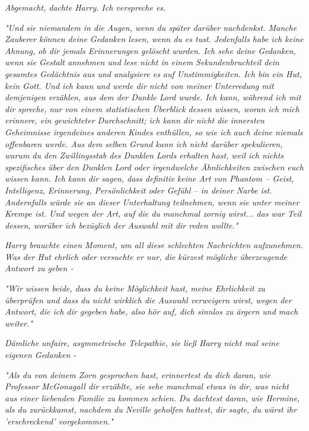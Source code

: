 {\emph{Abgemacht,} \emph{dachte Harry.} \emph{\emph{Ich verspreche es.}}

\emph{"Und sie niemandem in die Augen, wenn du später darüber nachdenkst. Manche Zauberer können deine Gedanken lesen, wenn du es tust. Jedenfalls habe ich keine Ahnung, ob dir jemals Erinnerungen gelöscht wurden. Ich sehe deine Gedanken, wenn sie Gestalt annehmen und lese nicht in einem Sekundenbruchteil dein gesamtes Gedächtnis aus und analysiere es auf Unstimmigkeiten. Ich bin ein Hut, kein Gott. Und ich kann und werde dir nicht von meiner Unterredung mit demjenigen erzählen, aus dem der Dunkle Lord wurde. Ich kann, während ich mit dir spreche,} \emph{nur} \emph{von einem statistischen Überblick dessen wissen, woran ich mich erinnere, ein gewichteter Durchschnitt; ich kann dir} \emph{nicht} \emph{\emph{die innersten Geheimnisse irgendeines anderen Kindes enthüllen, so wie ich}} \emph{\emph{auch deine niemals offenbaren werde. Aus dem selben Grund kann ich nicht darüber spekulieren, warum du den Zwillingsstab des Dunklen Lords erhalten hast, weil ich nichts spezifisches über den Dunklen Lord oder irgendwelche Ähnlichkeiten zwischen euch wissen kann. Ich}} \emph{kann} \emph{\emph{dir sagen, dass definitiv keine Art von Phantom -- Geist, Intelligenz, Erinnerung, Persönlichkeit oder Gefühl -- in deiner Narbe ist. Andernfalls würde sie an dieser Unterhaltung teilnehmen, wenn sie unter meiner Krempe ist. Und wegen der Art, auf die du manchmal zornig wirst... das war Teil dessen, worüber ich bezüglich der Auswahl mit dir reden wollte."}}

\emph{Harry brauchte einen Moment, um all diese schlechten Nachrichten aufzunehmen. Was der Hut ehrlich oder versuchte er nur, die} \emph{\emph{kürzest}} \emph{mögliche überzeugende Antwort zu geben -}

\emph{\emph{"Wir wissen beide, dass du keine Möglichkeit hast, meine Ehrlichkeit zu überprüfen und dass du nicht wirklich die Auswahl verweigern wirst, wegen der Antwort, die ich dir gegeben habe, also hör auf, dich sinnlos zu ärgern und mach weiter."}}

\emph{Dämliche unfaire, asymmetrische Telepathie, sie ließ Harry nicht mal seine eigenen Gedanken -}

\emph{\emph{"Als du von deinem Zorn gesprochen hast, erinnertest du dich daran, wie Professor McGonagall dir erzählte, sie sehe manchmal etwas in dir, was nicht aus einer liebenden Familie zu kommen schien. Du dachtest daran, wie Hermine, als du zurückkamst, nachdem du Neville geholfen hattest, dir sagte, du wärst ihr 'erschreckend' vorgekommen."}}

}
